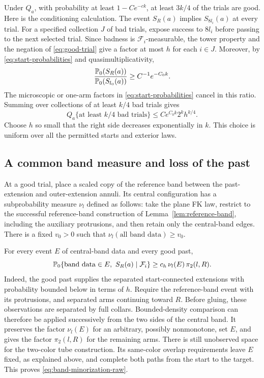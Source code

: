 Under $Q_a$, with probability at least $1-Ce^{-c k}$, at least
$3k/4$ of the trials are good.  Here is the conditioning calculation.
The event $S_R(a)$ implies $S_{8l_i}(a)$ at every trial.  For a
specified collection $J$ of bad trials, expose success to
$8l_i$ before passing to the next selected trial.  Since badness is
$\mathcal F_i$-measurable, the tower property and the negation of
\eqref{eq:good-trial} give a factor at most $h$ for each $i\in J$.
Moreover, by \eqref{eq:start-probabilities} and
quasimultiplicativity,
\[
 \frac{\mathbb P_0(S_R(a))}{\mathbb P_0(S_{l_0}(a))}
       \ge C^{-1}e^{-C_0 k}.
\]
The microscopic or one-arm factors in
\eqref{eq:start-probabilities} cancel in this ratio.  Summing over
collections of at least $k/4$ bad trials gives
\begin{equation}\label{eq:good-trial-tail}
 Q_a\{\text{at least }k/4\text{ bad trials}\}
 \le C e^{C_0 k}2^k h^{k/4}.
\end{equation}
Choose $h$ so small that the right side decreases exponentially
in $k$.  This choice is uniform over all the permitted starts and
exterior laws.

\subsection{A common band measure and loss of the past}

At a good trial, place a scaled copy of the reference band between
the past-extension and outer-extension annuli.  Its central
configuration has a subprobability measure $\nu_l$ defined as
follows: take the plane FK law, restrict to the successful
reference-band construction of Lemma~\ref{lem:reference-band},
including the auxiliary protrusions, and then retain only the
central-band edges.  There is a fixed $v_0>0$ such that
$\nu_l(\text{all band data})\ge v_0$.

For every event $E$ of central-band data and every good past,
\begin{equation}\label{eq:band-minorization-raw}
 \mathbb P_0\{\text{band data}\in E,\ S_R(a)
                     \mid\mathcal F_i\}
       \ge c_h\,\nu_l(E)\,\pi_2(l,R).
\end{equation}
Indeed, the good past supplies the separated start-connected
extensions with probability bounded below in terms of $h$.
Require the reference-band event with its protrusions, and
separated arms continuing toward $R$.  Before gluing, these
observations are separated by full collars.  Bounded-density
comparison can therefore be applied successively from the two
sides of the central band.  It preserves the factor $\nu_l(E)$
for an arbitrary, possibly nonmonotone, set $E$, and gives the
factor $\pi_2(l,R)$ for the remaining arms.  There is still
unobserved space for the two-color tube construction.  Its
same-color overlap requirements leave $E$ fixed, as explained
above, and complete both paths from the start to the target.
This proves \eqref{eq:band-minorization-raw}.

